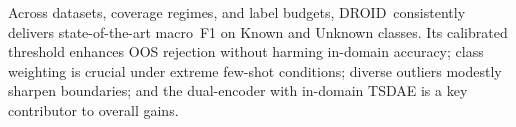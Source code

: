 \documentclass[journal,letterpaper]{IEEEtran}
\newcommand{\method}{\textsc{DROID}}
\begin{document}
Across datasets, coverage regimes, and label budgets, \method\ consistently delivers state-of-the-art macro~F1 on Known and Unknown classes. Its calibrated threshold enhances OOS rejection without harming in-domain accuracy; class weighting is crucial under extreme few-shot conditions; diverse outliers modestly sharpen boundaries; and the dual-encoder with in-domain TSDAE is a key contributor to overall gains. 










\end{document}
